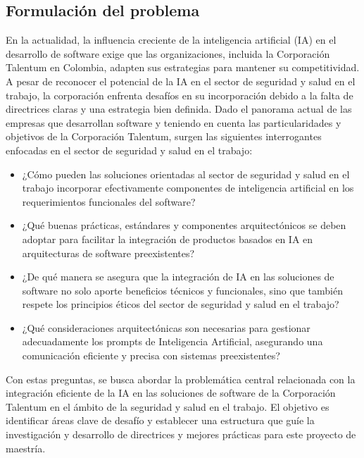 \subsection{Formulación del problema}

En la actualidad, la influencia creciente de la inteligencia artificial (IA) en el desarrollo de software exige que las organizaciones, incluida la Corporación Talentum en Colombia, adapten sus estrategias para mantener su competitividad. A pesar de reconocer el potencial de la IA en el sector de seguridad y salud en el trabajo, la corporación enfrenta desafíos en su incorporación debido a la falta de directrices claras y una estrategia bien definida.
Dado el panorama actual de las empresas que desarrollan software y teniendo en cuenta las particularidades y objetivos de la Corporación Talentum, surgen las siguientes interrogantes enfocadas en el sector de seguridad y salud en el trabajo:
\begin{itemize}
    \item ¿Cómo pueden las soluciones orientadas al sector de seguridad y salud en el trabajo incorporar efectivamente componentes de inteligencia artificial en los requerimientos funcionales del software?
    \item ¿Qué buenas prácticas, estándares y componentes arquitectónicos se deben adoptar para facilitar la integración de productos basados en IA en arquitecturas de software preexistentes?
    \item ¿De qué manera se asegura que la integración de IA en las soluciones de software no solo aporte beneficios técnicos y funcionales, sino que también respete los principios éticos del sector de seguridad y salud en el trabajo?
    \item ¿Qué consideraciones arquitectónicas son necesarias para gestionar adecuadamente los prompts de Inteligencia Artificial, asegurando una comunicación eficiente y precisa con sistemas preexistentes?
\end{itemize}

Con estas preguntas, se busca abordar la problemática central relacionada con la integración eficiente de la IA en las soluciones de software de la Corporación Talentum en el ámbito de la seguridad y salud en el trabajo. El objetivo es identificar áreas clave de desafío y establecer una estructura que guíe la investigación y desarrollo de directrices y mejores prácticas para este proyecto de maestría.